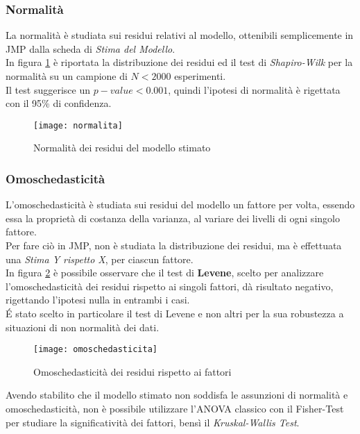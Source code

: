 \subsubsection*{Normalità}
La normalità è studiata sui residui relativi al modello, ottenibili semplicemente
in JMP dalla scheda di \textit{Stima del Modello}.\\
In figura \ref{normalita} è riportata la distribuzione dei residui ed il test
di \textit{Shapiro-Wilk} per la normalità su un campione di $N<2000$ esperimenti.\\
Il test suggerisce un $p-value<0.001$, quindi l'ipotesi di normalità è rigettata
con il 95\% di confidenza.\\

\begin{figure}[!htbp]
  \centering
  \texttt{[image: normalita]}
  \caption{Normalità dei residui del modello stimato}
  \label{normalita}
\end{figure}

\clearpage

\subsubsection*{Omoschedasticità}
L'omoschedasticità è studiata sui residui del modello un fattore per volta,
essendo essa la proprietà di costanza della varianza, al variare dei livelli di
ogni singolo fattore.\\
Per fare ciò in JMP, non è studiata la distribuzione dei residui,
ma è effettuata una \textit{Stima Y rispetto X}, per ciascun fattore.\\
In figura \ref{omoschedasticita} è possibile osservare che il test di \textbf{Levene},
scelto per analizzare l'omoschedasticità dei residui rispetto ai singoli fattori,
dà risultato negativo, rigettando l'ipotesi nulla in entrambi i casi.\\
\'E stato scelto in particolare il test di Levene e non altri per la sua
robustezza a situazioni di non normalità dei dati.\\

\begin{figure}[!htbp]
  \centering
  \texttt{[image: omoschedasticita]}
  \caption{Omoschedasticità dei residui rispetto ai fattori}
  \label{omoschedasticita}
\end{figure}

\clearpage

Avendo stabilito che il modello stimato non soddisfa le assunzioni di normalità e
omoschedasticità, non è possibile utilizzare l'ANOVA classico con il Fisher-Test
per studiare la significatività dei fattori, bensì il \textit{Kruskal-Wallis Test}.\\

